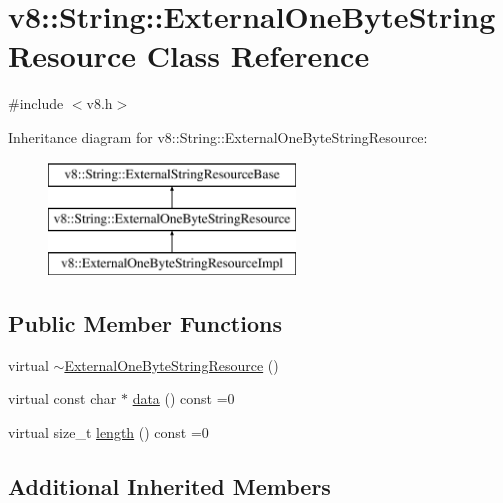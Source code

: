 \hypertarget{classv8_1_1_string_1_1_external_one_byte_string_resource}{}\section{v8\+:\+:String\+:\+:External\+One\+Byte\+String\+Resource Class Reference}
\label{classv8_1_1_string_1_1_external_one_byte_string_resource}


{\ttfamily \#include $<$v8.\+h$>$}

Inheritance diagram for v8\+:\+:String\+:\+:External\+One\+Byte\+String\+Resource\+:\begin{figure}[H]
\begin{center}
\leavevmode
\includegraphics[height=3.000000cm]{classv8_1_1_string_1_1_external_one_byte_string_resource}
\end{center}
\end{figure}
\subsection*{Public Member Functions}
\begin{DoxyCompactItemize}
\item 
virtual \hyperlink{classv8_1_1_string_1_1_external_one_byte_string_resource_a443edbb33926b2a9480fe0caac6e95ab}{$\sim$\+External\+One\+Byte\+String\+Resource} ()
\item 
virtual const char $\ast$ \hyperlink{classv8_1_1_string_1_1_external_one_byte_string_resource_aaeca31240d3dbf990d1b974e3c64593e}{data} () const =0
\item 
virtual size\+\_\+t \hyperlink{classv8_1_1_string_1_1_external_one_byte_string_resource_ad6b702f05798bcfc3975cb922f32b5ab}{length} () const =0
\end{DoxyCompactItemize}
\subsection*{Additional Inherited Members}


